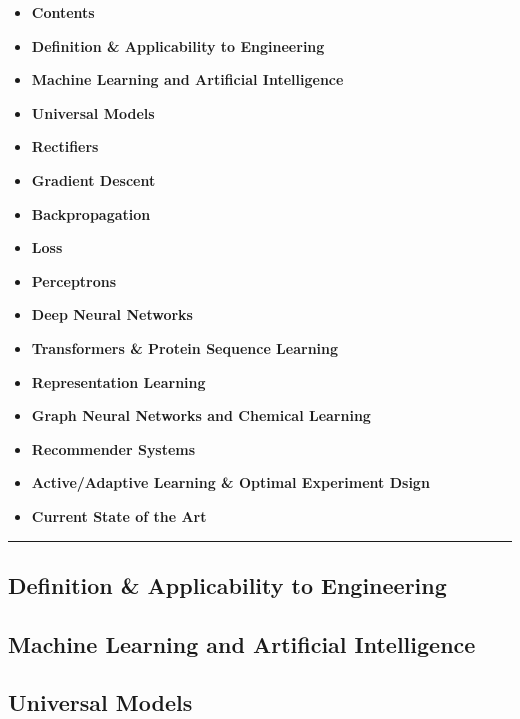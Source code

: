 \begin{itemize}
\tightlist
\item
  \textbf{Contents}
\item
  \textbf{Definition \& Applicability to Engineering}
\item
  \textbf{Machine Learning and Artificial Intelligence}
\item
  \textbf{Universal Models}
\item
  \textbf{Rectifiers}
\item
  \textbf{Gradient Descent}
\item
  \textbf{Backpropagation}
\item
  \textbf{Loss }
\item
  \textbf{Perceptrons}
\item
  \textbf{Deep Neural Networks}
\item
  \textbf{Transformers \& Protein Sequence Learning}
\item
  \textbf{Representation Learning}
\item
  \textbf{Graph Neural Networks and Chemical Learning}
\item
  \textbf{Recommender Systems}
\item
  \textbf{Active/Adaptive Learning \& Optimal Experiment Dsign}
\item
  \textbf{Current State of the Art}
\end{itemize}

\begin{center}\rule{0.5\linewidth}{0.5pt}\end{center}

\hypertarget{definition-applicability-to-engineering}{%
\subsection{Definition \& Applicability to
Engineering}\label{definition-applicability-to-engineering}}

\hypertarget{machine-learning-and-artificial-intelligence}{%
\subsection{Machine Learning and Artificial
Intelligence}\label{machine-learning-and-artificial-intelligence}}

\hypertarget{universal-models}{%
\subsection{Universal Models}\label{universal-models}}

